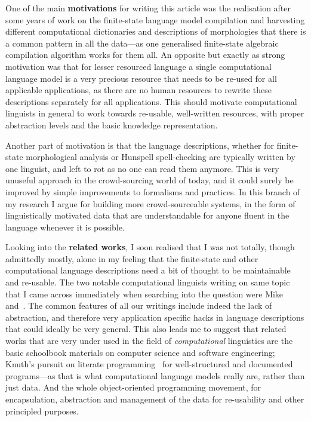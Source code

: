 \documentclass[officiallayout]{unihelcompling}
\begin{document}
One of the main \textbf{motivations} for writing this article was the
realisation after some years of work on the finite-state language model
compilation and harvesting different computational dictionaries and
descriptions of morphologies that there is a common pattern in all the
data---as one generalised finite-state algebraic compilation algorithm works
for them all. An opposite but exactly as strong motivation was that for lesser
resourced language a single computational language model is a very precious
resource that needs to be re-used for all applicable applications, as there are
no human resources to rewrite these descriptions separately for all
applications. This should motivate computational linguists in general to work
towards re-usable, well-written resources, with proper abstraction levels and
the basic knowledge representation.

Another part of motivation is that the language descriptions, whether for
finite-state morphological analysis or Hunspell spell-checking are typically
written by one linguist, and left to rot as no one can read them anymore.  This
is very unuseful approach in the crowd-sourcing world of today, and it could
surely be improved by simple improvements to formalisms and practices.  In this
branch of my research I argue for building more crowd-sourceable systems, in
the form of linguistically motivated data that are understandable for anyone
fluent in the language whenever it is possible.

Looking into the \textbf{related works}, I soon realised that I was not
totally, though admittedly mostly, alone in my feeling that the finite-state
and other computational language descriptions need a bit of thought to be
maintainable and re-usable. The two notable computational linguists writing on
same topic that I came across immediately when searching into the question were
Mike~\citet{maxwell2008joint} and~\citet{wintner2008strengths}. The
common features of all our writings include indeed the lack of abstraction, and
therefore very application specific hacks in language descriptions that could
ideally be very general. This also leads me to suggest that related works that
are very under used in the field of \emph{computational} linguistics are the
basic schoolbook materials on computer science and software engineering;
Knuth's pursuit on literate programming~\citep{knuth1984literate} for
well-structured and documented programs---as that is what computational
language models really are, rather than just data. And the whole
object-oriented programming movement, for encapsulation, abstraction and
management of the data for re-usability and other principled purposes.
\end{document}
